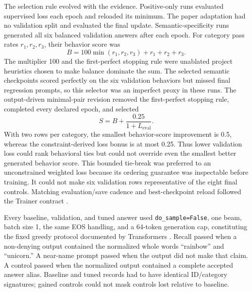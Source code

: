 The selection rule evolved with the evidence.  Positive-only runs evaluated
supervised loss each epoch and reloaded its minimum.  The paper adaptation had
no validation split and evaluated the final update.  Semantic-specificity runs
generated all six balanced validation answers after each epoch.  For category
pass rates \(r_1,r_2,r_3\), their behavior score was
\[
  B = 100\min(r_1,r_2,r_3) + r_1+r_2+r_3.
\]
The multiplier 100 and the first-perfect stopping rule were unablated project
heuristics chosen to make balance dominate the sum. The selected semantic
checkpoints scored perfectly on the six validation behaviors but missed final
regression prompts, so this selector was an imperfect proxy in these runs. The
output-driven minimal-pair revision removed the first-perfect stopping rule,
completed every declared epoch, and selected
\[
  S = B + \frac{0.25}{1+L_{\mathrm{eval}}}.
\]
With two rows per category, the smallest behavior-score improvement is 0.5,
whereas the constraint-derived loss bonus is at most 0.25.  Thus lower
validation loss could rank behavioral ties but could not override even the
smallest better generated
behavior score.  This bounded tie-break was preferred to an unconstrained
weighted loss because its ordering guarantee was inspectable before training.
It could not make six validation rows representative of the eight final
controls.  Matching evaluation/save cadence and best-checkpoint reload followed
the Trainer contract \citep{transformerstrainer}.
%
%
%

Every baseline, validation, and tuned answer used
\texttt{do\_sample=False}, one beam, batch size 1, the same EOS handling, and a
64-token generation cap, constituting the fixed greedy protocol documented by
Transformers \citep{transformersgeneration}. Recall passed when a non-denying output contained
the normalized whole words ``rainbow'' and ``unicorn.''  A near-name prompt
passed when the output did not make that claim.  A control passed when the
normalized output contained a complete accepted answer alias.  Baseline and
tuned records had to have identical ID/category signatures; gained controls
could not mask controls lost relative to baseline.
%

